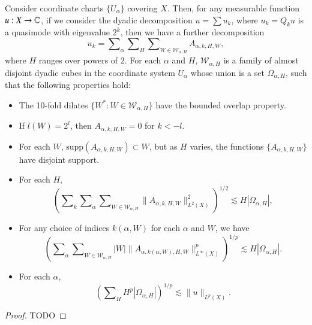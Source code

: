 \begin{lemma} \label{atomicdecompositionlemma}
    Consider coordinate charts $\{ U_\alpha \}$ covering $X$. Then, for any measurable function $u: X \to \operatorname{\mathbb{C}}$, if we consider the dyadic decomposition $u = \sum u_k$, where $u_k = Q_k u$ is a quasimode with eigenvalue $2^k$, then we have a further decomposition
    \[ u_k = \sum\nolimits_\alpha \sum\nolimits_H \sum\nolimits_{W \in \mathcal{W}_{\alpha,H}} A_{\alpha,k,H,W}, \]
    where $H$ ranges over powers of $2$. For each $\alpha$ and $H$, $\mathcal{W}_{\alpha,H}$ is a family of almost disjoint dyadic cubes in the coordinate system $U_\alpha$ whose union is a set $\Omega_{\alpha,H}$, such that the following properties hold:
    \begin{itemize}
        \item The 10-fold dilates $\{ W^* : W \in \mathcal{W}_{\alpha,H} \}$ have the bounded overlap property.

        \item If $l(W) = 2^l$, then $A_{\alpha,k,H,W} = 0$ for $k < -l$.

        \item For each $W$, $\text{supp}(A_{\alpha,k,H,W}) \subset W$, but as $H$ varies, the functions $\{ A_{\alpha,k,H,W} \}$ have disjoint support.

        \item For each $H$,
        \[ \left( \sum\nolimits_k \sum\nolimits_\alpha \sum\nolimits_{W \in \mathcal{W}_{\alpha,H}} \| A_{\alpha,k,H,W} \|_{L^2(X)}^2 \right)^{1/2} \lesssim H |\Omega_{\alpha,H}|, \]

        \item For any choice of indices $k(\alpha,W)$ for each $\alpha$ and $W$, we have
        \[ \left( \sum\nolimits_\alpha \sum\nolimits_{W \in \mathcal{W}_{\alpha,H}} |W| \| A_{\alpha,k(\alpha,W),H,W} \|_{L^\infty(X)}^p \right)^{1/p} \lesssim H |\Omega_{\alpha,H}|. \]

        \item For each $\alpha$,
        \[ \left( \sum\nolimits_H H^p |\Omega_{\alpha,H}| \right)^{1/p} \lesssim \| u \|_{L^p(X)}. \]
    \end{itemize}
\end{lemma}
\begin{proof}
    TODO
\end{proof}

